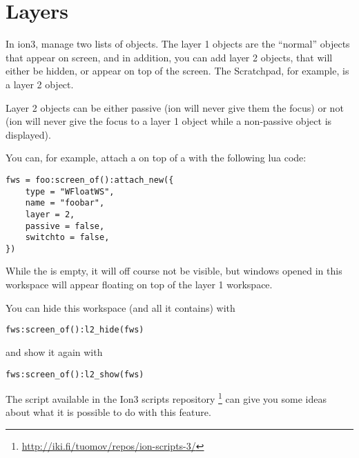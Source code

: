 \section{Layers}

In ion3,  manage two lists of objects. The layer 1
objects are the ``normal'' objects that appear on screen, and in
addition, you can add layer 2 objects, that will either be hidden, or
appear on top of the screen. The Scratchpad, for example, is a layer 2
object.

Layer 2 objects can be either passive (ion will never give them the
focus) or not (ion will never give the focus to a layer 1 object while
a non-passive object is displayed).

You can, for example, attach a  on top of a
 with the following lua code:

\begin{verbatim}
fws = foo:screen_of():attach_new({
    type = "WFloatWS",
    name = "foobar",
    layer = 2,
    passive = false,
    switchto = false,
})
\end{verbatim}

While the  is empty, it will off course not be visible,
but windows opened in this workspace will appear floating on top of
the layer 1 workspace.

You can hide this workspace (and all it contains) with

\begin{verbatim}
fws:screen_of():l2_hide(fws)
\end{verbatim}

and show it again with

\begin{verbatim}
fws:screen_of():l2_show(fws)
\end{verbatim}

The script  available in the Ion3 scripts repository%
\footnote{\url{http://iki.fi/tuomov/repos/ion-scripts-3/}}
can give you some ideas about what it is possible to do with this feature.



